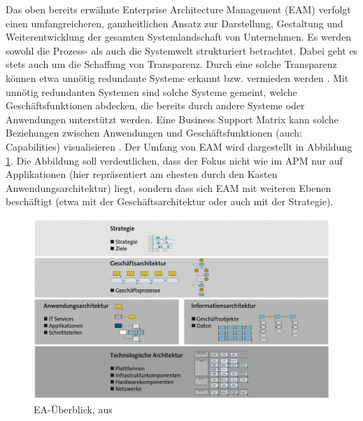 Das oben bereits erwähnte Enterprise Architecture Management (EAM) verfolgt einen umfangreicheren, ganzheitlichen Ansatz zur Darstellung, Gestaltung und Weiterentwicklung der gesamten Systemlandschaft von Unternehmen. Es werden sowohl die Prozess- als auch die Systemwelt strukturiert betrachtet. Dabei geht es stets auch um die Schaffung von Transparenz. Durch eine solche Transparenz können etwa unnötig redundante Systeme erkannt bzw. vermieden werden \cite[S. 7-10]{Bitkom}. Mit unnötig redundanten Systemen sind solche Systeme gemeint, welche Geschäftsfunktionen abdecken, die bereits durch andere Systeme oder Anwendungen unterstützt werden. Eine Business Support Matrix kann solche Beziehungen zwischen Anwendungen und Geschäftsfunktionen (auch: Capabilities) visualisieren \cite{jung1}. 
Der Umfang von EAM wird dargestellt in Abbildung \ref{Abbildung:ea}. Die Abbildung soll verdeutlichen, dass der Fokus nicht wie im APM nur auf Applikationen (hier repräsentiert am ehesten durch den Kasten Anwendungsarchitektur) liegt, sondern dass sich EAM mit weiteren Ebenen beschäftigt (etwa mit der Geschäftsarchitektur oder auch mit der Strategie).
 
\begin{figure}[h]
\centering
\includegraphics[scale=0.9]{content/pics/Picture_8.png}
\caption{EA-Überblick, aus \cite[S. 13]{Bitkom}}
\label{Abbildung:ea}
\end{figure}


